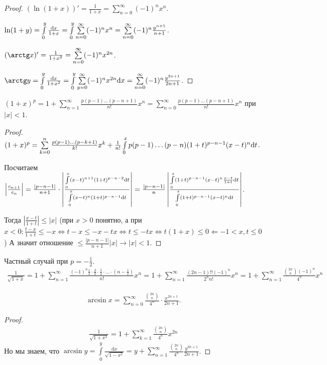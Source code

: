 \begin{proof}
    $(\ln (1+x))' = \frac{1}{1+x} = \sum\limits_{n=0}^\infty (-1)^n x^n$.

    $\ln(1+y) = \int\limits_0^y \frac{\mathrm{d}x}{1+x} = \int\limits_0^y \sum\limits_{n=0}^\infty (-1)^n x^n = \sum\limits_{n=0}^\infty (-1)^n \frac{y^{n+1}}{n+1}$.

     $(\arctg x)' = \frac{1}{1+x^2} = \sum\limits_{n=0}^\infty (-1)^n x^{2n}$.

     $\arctg y = \int\limits_0^y \frac{\dx}{1+x^2} = \int\limits_0^y \sum\limits_{y=0}^\infty (-1)^n x^{2n} \dx = \sum\limits_{n=0}^\infty (-1)^n \frac{y^{2n+1}}{2n+1}$.
\end{proof}
\begin{example}
    $(1+x)^p = 1 + \sum\limits_{n=1}^\infty \frac{p(p-1)\ldots(p-n+1)}{n!}x^n = \sum\limits_{n=0}^\infty \frac{p(p-1)\ldots(p-n+1)}{n!}x^n$ при $|x| < 1$.
\end{example}
\begin{proof}
    $(1+x)^p = \sum\limits_{k=0}^n \frac{p(p-1)\ldots (p-k+1)}{k!}x^k + \frac{1}{n!}\int\limits_0^x p(p-1)\ldots (p-n)(1+t)^{p-n-1}(x-t)^n \mathrm{d}t$. 

    Посчитаем $\left| \frac{c_{n+1}}{c_n} \right| = \frac{|p-n-1|}{n + 1} \cdot \left| \frac{\int\limits_0^x (x-t)^{n+1} (1+t)^{p-n-2} \mathrm{d}t}{\int\limits_0^x (x-t)^n (1+t)^{p-n-1} \mathrm{d}t} \right| = \frac{|p-n - 1|}{n} \left| \frac{\int\limits_0^x (1+t)^{p-n - 1}(x-t)^{n}\frac{x-t}{1+t} \mathrm{d}t}{\int\limits_0^x (1+t)^{p-n - 1} (x-t)^{n}\mathrm{d}t} \right|$.

    Тогда $\left| \frac{x-t}{1+t} \right| \le |x|$ (при $x > 0$ понятно, а при  $x < 0\!: \frac{t - x}{1+t} \le - x \iff t-x \le -x -tx \iff t \le -tx \iff t(1+x) \le 0 \Leftarrow -1 < x, t \le 0$) А значит отношение $\le \frac{|p - n - 1|}{n + 1}|x| \to |x| < 1$.
\end{proof}
\begin{example}
    Частный случай при  $p = -\frac{1}{2}$. 
    \begin{align*}
        \frac{1}{\sqrt{1+x}} = 1 + \sum\limits_{n=1}^\infty \frac{(-1)^n\frac{1}{2} \cdot \frac{3}{2} \cdot \frac{5}{2} \cdot \ldots \cdot (n-\frac{1}{2})}{n!}x^n = 1 + \sum \limits_{n=1}^\infty \frac{(2n-1)!!(-1)^n}{2^nn!}x^n = 1 + \sum\limits_{n=1}^\infty \frac{\binom{2n}{n}(-1)^n}{4^n}x^n
    \end{align*}
\end{example}
\begin{example}
    \begin{align*}
        \arcsin x = \sum\limits_{n=0}^\infty \frac{\binom{2n}{n}}{4^n} \cdot \frac{x^{2n+1}}{2n+1}.
    \end{align*}
\end{example}
\begin{proof}
     \begin{align*}
        \frac{1}{\sqrt{1+x^2}} = 1 + \sum\limits_{k=1}^\infty \frac{\binom{2n}{n}}{4^n}x^{2n}
    \end{align*}
    Но мы знаем, что $\arcsin y = \int\limits_0^y \frac{\mathrm{d}x}{\sqrt{1-x^2}} = y + \sum\limits_{n=1}^\infty \frac{\binom{2n}{n}}{4^n} \frac{y^{2n+1}}{2n+1}$.
\end{proof}
